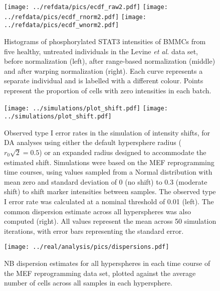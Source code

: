 \documentclass{article}
\begin{document}
\begin{figure}[tbp]
    \begin{center}
        \texttt{[image: ../refdata/pics/ecdf\_raw2.pdf]}
        \texttt{[image: ../refdata/pics/ecdf\_rnorm2.pdf]}
        \texttt{[image: ../refdata/pics/ecdf\_wnorm2.pdf]}
    \end{center}
    \caption{Histograms of phosphorylated STAT3 intensities of BMMCs from five healthy, untreated individuals in the Levine \textit{et al.} data set, before normalization (left), after range-based normalization (middle) and after warping normalization (right).
        Each curve represents a separate individual and is labelled with a different colour.
        Points represent the proportion of cells with zero intensities in each batch.
    }
    \label{fig:quantile}
\end{figure}

\begin{figure}[tbp]
    \begin{center}
        \texttt{[image: ../simulations/plot\_shift.pdf]}
        \texttt{[image: ../simulations/plot\_shift.pdf]}
    \end{center}
    \caption{Observed type I error rates in the simulation of intensity shifts, for DA analyses using either the default hypersphere radius ($r_0\sqrt{2}=0.5$) or an expanded radius designed to accommodate the estimated shift.
        Simulations were based on the MEF reprogramming time courses, using values sampled from a Normal distribution with mean zero and standard deviation of 0 (no shift) to 0.3 (moderate shift) to shift marker intensities between samples. 
        The observed type I error rate was calculated at a nominal threshold of 0.01 (left).
        The common dispersion estimate across all hyperspheres was also computed (right).
        All values represent the mean across 50 simulation iterations, with error bars representing the standard error.
    }
\label{fig:shift_sim}
\end{figure}

\begin{figure}[tbp]
    \begin{center}
    \texttt{[image: ../real/analysis/pics/dispersions.pdf]}
    \end{center}
    \caption{NB dispersion estimates for all hyperspheres in each time course of the MEF reprogramming data set, plotted against the average number of cells across all samples in each hypersphere.}
    \label{fig:nbdisp}
\end{figure}
\end{document}
